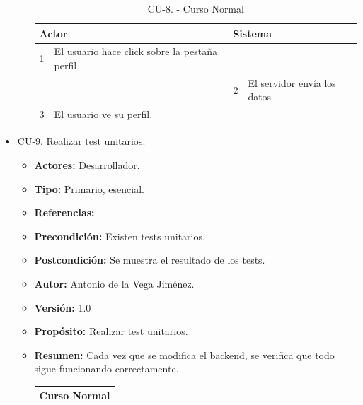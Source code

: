 \begin{itemize}
\begin{itemize}
\begin{table}[H]
\begin{tabularx}{\textwidth}{|l|X|l|X|}
        \multicolumn{2}{|l|}{\cellcolor[HTML]{EFEFEF}Actor} & \multicolumn{2}{l|}{\cellcolor[HTML]{EFEFEF}Sistema} \\ \hline
        1                         & El usuario hace click sobre la pestaña perfil                     &                            &                         \\ \hline
                                  &                         & 2                          & El servidor envía los datos                     \\ \hline
        3                         & El usuario ve su perfil.      &                          &                        \\ \hline
                                  
      \end{tabularx}
      \caption{CU-8. - Curso Normal}
      \label{table-13}
    \end{table}
  \end{itemize}
  \item CU-9. Realizar test unitarios.
  \begin{itemize}
    \item \textbf{Actores:} Desarrollador.
    \item \textbf{Tipo:} Primario, esencial.
    \item \textbf{Referencias:}
    \item \textbf{Precondición:} Existen tests unitarios.
    \item \textbf{Postcondición:} Se muestra el resultado de los tests.
    \item \textbf{Autor:} Antonio de la Vega Jiménez.
    \item \textbf{Versión:} 1.0
    \item \textbf{Propósito:} Realizar test unitarios.
    \item \textbf{Resumen:} Cada vez que se modifica el backend, se verifica que todo sigue funcionando correctamente.
    \begin{table}[H]
      \centering
      \begin{tabularx}{\textwidth}{|l|X|l|X|}
        \hline
        \multicolumn{4}{|c|}{\cellcolor[HTML]{C0C0C0}Curso Normal}                                                 \\ \hline

\end{tabularx}
\end{table}
\end{itemize}
\end{itemize}
